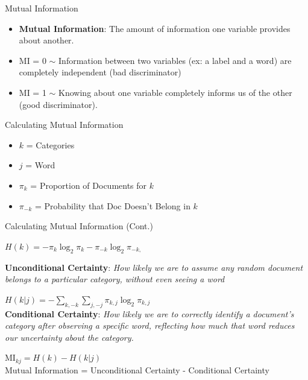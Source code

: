 \documentclass[
  ignorenonframetext,
  aspectratio=169]{beamer}
\begin{document}
\begin{frame}{Mutual Information}
\label{mutual-information}
\begin{itemize}
\item \textbf{Mutual Information}: The amount of information one variable provides about another.  \pause \par \vspace{2.5mm}
\item MI = 0 $\sim$ Information between two variables (ex: a label and a word) are completely independent (bad discriminator) \pause \par \vspace{2.5mm}
\item MI = 1 $\sim$ Knowing about one variable completely informs us of the other (good discriminator). 
\end{itemize}
\end{frame}

\begin{frame}{Calculating Mutual Information}
\label{calculating-mutual-information}
\begin{itemize}
\item $k$ = Categories
\item $j$ = Word
\item $\pi_k$ = Proportion of Documents for $k$
\item $\pi_{-k}$ = Probability that Doc Doesn't Belong in $k$
\end{itemize}
\end{frame}

\begin{frame}{Calculating Mutual Information (Cont.)}
\label{calculating-mutual-information-cont.}
\begin{center}
 $H(k) = -\pi_k\log_2\pi_k-\pi_{-k}\log_2\pi_{-k,} $ \par \vspace{2.5mm} \textbf{Unconditional Certainty}:   \footnotesize{\textit{How likely we are to assume any random document belongs to a particular category, without even seeing a word}} \par \vspace{5mm} \pause \normalsize
 $H(k|j) = -\sum_{k,-k}\sum_{j,-j}\pi_{k,j}\log_2\pi_{k,j} $ \\  \textbf{Conditional Certainty}: \footnotesize{\textit{How likely we are to correctly identify a document’s category after observing a specific word, reflecting how much that word reduces our uncertainty about the category.}}  \par \vspace{5mm} \pause
 $\text{MI}_{kj} = H(k) - H(k|j)$ \\ Mutual Information = Unconditional Certainty - Conditional Certainty
\end{center}
\end{frame}
\end{document}

